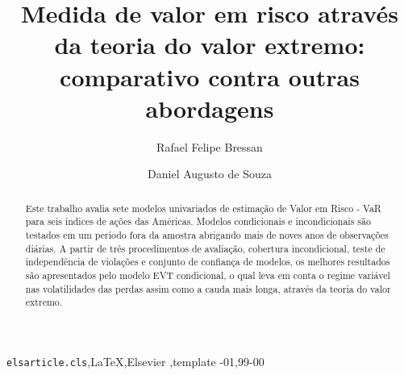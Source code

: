 \documentclass[review]{elsarticle}
\theoremstyle{definition}
\begin{document}
	
\listoftodos

\begin{frontmatter}

\title{Medida de valor em risco através da teoria do valor extremo:\\comparativo contra outras abordagens}




\author[mymainaddress]{Rafael Felipe Bressan}
%
\author[mymainaddress]{Daniel Augusto de Souza}

\address[mymainaddress]{Avenida Madre Benvenuta, 2007 - Santa Mônica Florianópolis - SC 88035-901}

\begin{abstract}
	Este trabalho avalia sete modelos univariados de estimação de Valor em Risco - VaR para seis índices de ações das Américas. Modelos condicionais e incondicionais são testados em um período fora da amostra abrigando mais de noves anos de observações diárias. A partir de três procedimentos de avaliação, cobertura incondicional, teste de independência de violações e conjunto de confiança de modelos, os melhores resultados são apresentados pelo modelo EVT condicional, o qual leva em conta o regime variável nas volatilidades das perdas assim como a cauda mais longa, através da teoria do valor extremo.
\end{abstract}

\begin{keyword}
\texttt{elsarticle.cls}\sep \LaTeX\sep Elsevier \sep template
-01\sep  99-00
\end{keyword}

\end{frontmatter}
\end{document}
